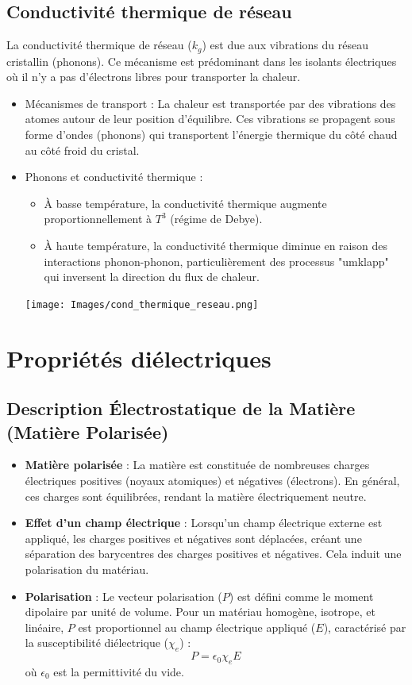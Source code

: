 \documentclass{article}
\begin{document}
    \subsection{Conductivité thermique de réseau}
    La conductivité thermique de réseau ($k_g$) est due aux vibrations du réseau cristallin (phonons). Ce mécanisme est prédominant dans les isolants électriques où il n'y a pas d'électrons libres pour transporter la chaleur.
    \begin{itemize}
        \item Mécanismes de transport : La chaleur est transportée par des vibrations des atomes autour de leur position d'équilibre. Ces vibrations se propagent sous forme d'ondes (phonons) qui transportent l'énergie thermique du côté chaud au côté froid du cristal.
        \item Phonons et conductivité thermique :
        \begin{itemize}
            \item À basse température, la conductivité thermique augmente proportionnellement à $T^3$ (régime de Debye).
            \item À haute température, la conductivité thermique diminue en raison des interactions phonon-phonon, particulièrement des processus "umklapp" qui inversent la direction du flux de chaleur.
        \end{itemize}
            \texttt{[image: Images/cond\_thermique\_reseau.png]}
    \end{itemize}

\section{Propriétés diélectriques}
    \subsection{Description Électrostatique de la Matière (Matière Polarisée)}
    \begin{itemize}
        \item \textbf{Matière polarisée} : La matière est constituée de nombreuses charges électriques positives (noyaux atomiques) et négatives (électrons). En général, ces charges sont équilibrées, rendant la matière électriquement neutre.
        \item \textbf{Effet d'un champ électrique} : Lorsqu'un champ électrique externe est appliqué, les charges positives et négatives sont déplacées, créant une séparation des barycentres des charges positives et négatives. Cela induit une polarisation du matériau.
        \item \textbf{Polarisation} : Le vecteur polarisation ($P$) est défini comme le moment dipolaire par unité de volume. Pour un matériau homogène, isotrope, et linéaire, $P$ est proportionnel au champ électrique appliqué ($E$), caractérisé par la susceptibilité diélectrique ($\chi_e$) :
        \[
        P = \epsilon_0 \chi_e E
        \]
        où $\epsilon_0$ est la permittivité du vide.
    \end{itemize}
    
\end{document}
